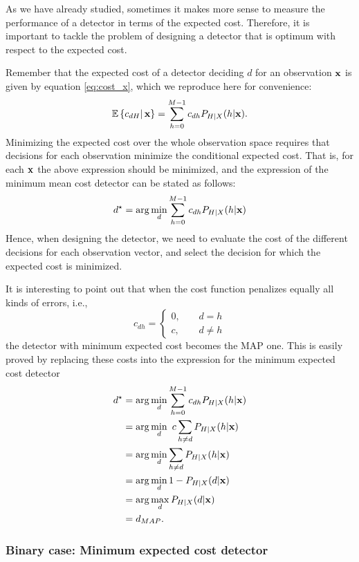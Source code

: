 As we have already studied, sometimes it makes more sense to measure the performance of a detector in terms of the expected cost. Therefore, it is important to tackle the problem of designing a detector that is optimum with respect to the expected cost.

Remember that the expected cost of a detector deciding $d$ for an observation ${\bf x}$ is given by equation \eqref{eq:cost_x}, which we reproduce here for convenience:
\begin{equation}
    \mathbb{E}\left\{ c_{dH}\right|{\bf x}\} = \sum_{h=0}^{M-1} c_{dh} P_{H|X}(h|{\bf x}) \label{eq:mean_x_2}.
\end{equation}
Minimizing the expected cost over the whole observation space requires that decisions for each observation minimize the conditional expected cost. That is, for each ${\bf x}$ the above expression should be minimized, and the expression of the minimum mean cost detector can be stated as follows:
$$d^\star = \arg\min_{d} \sum_{h=0}^{M-1} c_{dh} P_{H|X}(h|{\bf x})$$
Hence, when designing the detector, we need to evaluate the cost of the different decisions for each observation vector, and select the decision for which the expected cost is minimized.

It is interesting to point out that when the cost function penalizes equally all kinds of errors, i.e.,
$$c_{dh} = \left\{\begin{array}{ll} 0, & \;\;\;\;d=h \\ c, & \;\;\;\;d\neq h\end{array}\right.$$
the detector with minimum expected cost becomes the MAP one. This is easily proved by replacing these costs into the expression for the minimum expected cost detector
\begin{align}
    d^\star & = \arg\min_{d} \sum_{h=0}^{M-1} c_{dh} P_{H|X}(h|{\bf x}) \nonumber \\
            & = \arg\min_{d} \ c \sum_{h\neq d} P_{H|X}(h|{\bf x}) \nonumber \\
            & = \arg\min_{d} \sum_{h\neq d} P_{H|X}(h|{\bf x}) \nonumber \\
            & = \arg\min_{d} 1 - P_{H|X}(d|{\bf x}) \nonumber \\
            & = \arg\max_{d} P_{H|X}(d|{\bf x}) \nonumber \\
            & = d_{MAP}.
\end{align}

\subsubsection{Binary case: Minimum expected cost detector}


